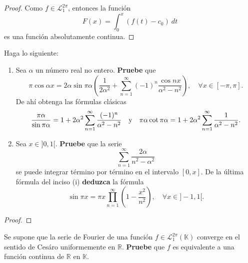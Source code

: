 \documentclass[12pt]{report}
\theoremstyle{largebreak}
\begin{document}
    \begin{proof}
        Como $f\in\mathcal{L}_1^{2\pi}$, entonces la función
        \begin{equation*}
            F(x)=\int_{0}^{x}\left(f(t)-c_0 \right)\:dt
        \end{equation*}
        es una función absolutamente continua.
    \end{proof}

    \begin{excer}
        Haga lo siguiente:
        \begin{enumerate}
            \item Sea $\alpha$ un número real no entero. \textbf{Pruebe} que
            \begin{equation*}
                \pi\cos\alpha x=2\alpha\sin\pi\alpha\left(\frac{1}{2\alpha^2}+\sum_{ n=1}^\infty(-1)^n\frac{\cos nx}{\alpha^2-n^2} \right),\quad\forall x\in[-\pi,\pi].
            \end{equation*}
            De ahí obtenga las fórmulas clásicas
            \begin{equation*}
                \frac{\pi\alpha}{\sin\pi\alpha}=1+2\alpha^2\sum_{ n=1}^\infty\frac{(-1)^n}{\alpha^2-n^2}\quad\textup{y}\quad\pi\alpha\cot\pi\alpha=1+2\alpha^2\sum_{ n=1}^\infty\frac{1}{\alpha^2-n^2}.
            \end{equation*}
            \item Sea $x\in]0,1[$. \textbf{Pruebe} que la serie
            \begin{equation*}
                \sum_{ n=1}^\infty\frac{2\alpha}{n^2-\alpha^2}
            \end{equation*}
            se puede integrar término por término en el intervalo $[0,x]$. De la última fórmula del inciso (i) \textbf{deduzca} la fórmula
            \begin{equation*}
                \sin\pi x=\pi x\prod_{ n=1}^\infty\left(1-\frac{x^2}{n^2} \right),\quad\forall x\in]-1,1[.
            \end{equation*}
        \end{enumerate}
    \end{excer}

    \begin{proof}
        
    \end{proof}

    \begin{excer}
        Se supone que la serie de Fourier de una función $f\in\mathcal{L}_1^{2\pi}(\mathbb{K})$ converge en el sentido de Cesáro uniformemente en $\mathbb{R}$. \textbf{Pruebe} que $f$ es equivalente a una función continua de $\mathbb{R}$ en $\mathbb{K}$.
    \end{excer}
\end{document}
